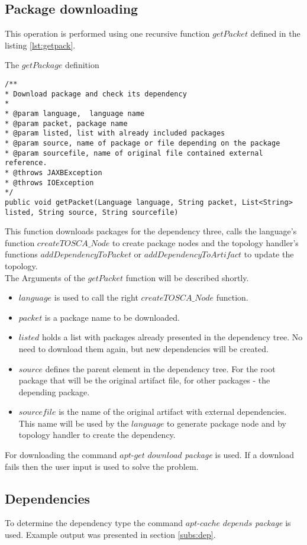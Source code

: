 \subsection*{Package downloading}
This operation is performed using one recursive function $getPacket$ defined in the listing \ref{lst:getpack}.
\begin{Listing}
\caption{The $getPackage$ definition}
\label{lst:getpack}
\begin{lstlisting}
/**
* Download package and check its dependency
* 
* @param language,  language name
* @param packet, package name
* @param listed, list with already included packages
* @param source, name of package or file depending on the package
* @param sourcefile, name of original file contained external reference.
* @throws JAXBException
* @throws IOException
*/
public void getPacket(Language language, String packet, List<String> listed, String source, String sourcefile)
\end{lstlisting}
\end{Listing}
This function downloads packages for the dependency three, calls the language's function $createTOSCA\_Node$ to create package nodes and the topology handler's functions $addDependencyToPacket$ or $addDependencyToArtifact$ to update the topology.\\
The Arguments of the $getPacket$ function will be described shortly.
\begin{itemize}
	\item $language$ is used to call the right $createTOSCA\_Node$ function.
	\item $packet$ is a package name to be downloaded.
	\item $listed$ holds a list with packages already presented in the dependency tree. No need to download them again, but new dependencies will be created.
	\item $source$ defines the parent element in the dependency tree. For the root package that will be the original artifact file, for other packages - the depending package.
	\item $sourcefile$ is the name of the original artifact with external dependencies. This name will be used by the $language$ to generate package node and by topology handler to create the dependency. 
\end{itemize}
For downloading the command $apt$-$get$ $download$ \emph{package} is used. 
If a download fails then the user input is used to solve the problem. 

\subsection*{Dependencies}
To determine the dependency type the command $apt$-$cache$ $depends$  \emph{package} is used.
Example output was presented in section \ref{subs:dep}.

